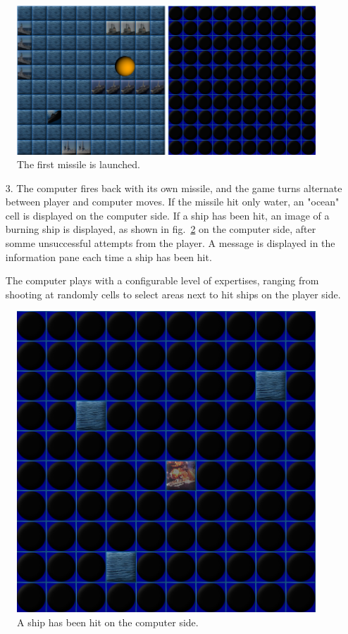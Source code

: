 \documentclass[twoside]{article}
\begin{document}
\begin{figure}[h!]
\centering
\includegraphics[scale=0.65]{figures/missileLaunch.png}
\caption{The first missile is launched.}
\label{fig:missileLaunch}
\end{figure}

\begin{enumerate}
\item[3.] The computer fires back with its own missile, and the game turns alternate between player and computer moves. If the missile hit only water, an "ocean" cell is displayed on the computer side. If a ship has been hit, an image of a burning ship is displayed, as shown in fig.~\ref{fig:hitShip} on the computer side, after somme unsuccessful attempts from the player. A message is displayed in the information pane each time a ship has been hit.

The computer plays with a configurable level of expertises, ranging from shooting at randomly cells to select areas next to hit ships on the player side.
\end{enumerate}

\begin{figure}[h!]
\centering
\includegraphics[scale=0.45]{figures/hitShip.png}
\caption{A ship has been hit on the computer side.}
\label{fig:hitShip}
\end{figure}
\end{document}
